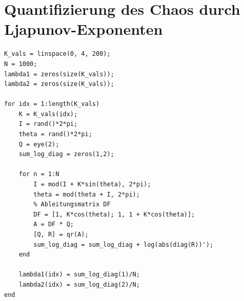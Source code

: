 \documentclass[paper=a4, 
                DIV=12]{scrartcl}
\begin{document}
\newpage
\section{Quantifizierung des Chaos durch Ljapunov-Exponenten}

\begin{lstlisting}[frame=single, style=Matlab-editor]
K_vals = linspace(0, 4, 200);
N = 1000;
lambda1 = zeros(size(K_vals));
lambda2 = zeros(size(K_vals));

for idx = 1:length(K_vals)
    K = K_vals(idx);
    I = rand()*2*pi;
    theta = rand()*2*pi;
    Q = eye(2);
    sum_log_diag = zeros(1,2);

    for n = 1:N
        I = mod(I + K*sin(theta), 2*pi);
        theta = mod(theta + I, 2*pi);
        % Ableitungsmatrix DF
        DF = [1, K*cos(theta); 1, 1 + K*cos(theta)];
        A = DF * Q;
        [Q, R] = qr(A);
        sum_log_diag = sum_log_diag + log(abs(diag(R))');
    end

    lambda1(idx) = sum_log_diag(1)/N;
    lambda2(idx) = sum_log_diag(2)/N;
end
\end{lstlisting}
\end{document}
